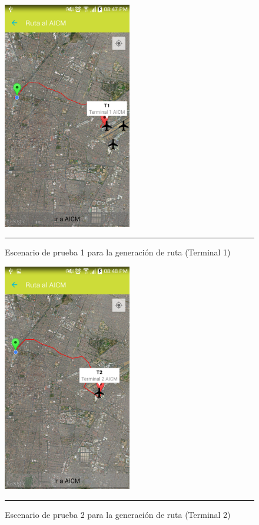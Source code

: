 \begin{figure}[h]
	\centering
		\includegraphics[width=0.5\textwidth]{Figuras/escenariot1.png}
		\rule{30em}{0.5pt}
	\caption[Escenario de prueba 1 para la generación de ruta (Terminal 1)]{Escenario de prueba 1 para la generación de ruta (Terminal 1)}
	\label{fig:vistaPruebaR1}
\end{figure}
\clearpage

\begin{figure}[h]
	\centering
		\includegraphics[width=0.5\textwidth]{Figuras/escenariot2.png}
		\rule{30em}{0.5pt}
	\caption[Escenario de prueba 2 para la generación de ruta (Terminal 2)]{Escenario de prueba 2 para la generación de ruta (Terminal 2)}
	\label{fig:vistaPruebaR2}
\end{figure}
\clearpage

